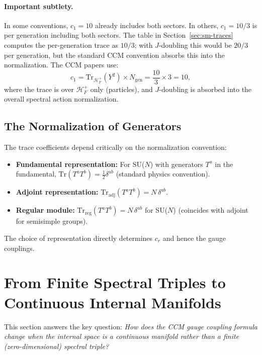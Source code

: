 \documentclass[12pt,a4paper]{article}
\begin{document}
\paragraph{Important subtlety.}
In some conventions, $c_1 = 10$ already includes both sectors.  In others,
$c_1 = 10/3$ is per generation including both sectors.  The
table in Section~\ref{sec:sm-traces} computes the per-generation trace as
$10/3$; with $J$-doubling this would be $20/3$ per generation, but the
standard CCM convention absorbs this into the normalization.  The CCM papers
use:
\begin{equation}
c_1 = \mathrm{Tr}_{\mathcal{H}_F^+}(Y^2) \times N_{\mathrm{gen}} = \frac{10}{3} \times 3 = 10,
\end{equation}
where the trace is over $\mathcal{H}_F^+$ only (particles), and $J$-doubling
is absorbed into the overall spectral action normalization.

\subsection{The Normalization of Generators}

The trace coefficients depend critically on the normalization convention:
\begin{itemize}
\item \textbf{Fundamental representation:} For SU($N$) with generators $T^a$
  in the fundamental, $\mathrm{Tr}(T^a T^b) = \tfrac{1}{2}\delta^{ab}$
  (standard physics convention).
\item \textbf{Adjoint representation:} $\mathrm{Tr}_{\mathrm{adj}}(T^a T^b)
  = N\,\delta^{ab}$.
\item \textbf{Regular module:} $\mathrm{Tr}_{\mathrm{reg}}(T^a T^b)
  = N\,\delta^{ab}$ for SU($N$) (coincides with adjoint for semisimple groups).
\end{itemize}

The choice of representation directly determines $c_r$ and hence the
gauge couplings.

\section{From Finite Spectral Triples to Continuous Internal Manifolds}
\label{sec:finite-to-continuous}

This section answers the key question: \textit{How does the CCM gauge
coupling formula change when the internal space is a continuous manifold
rather than a finite (zero-dimensional) spectral triple?}
\end{document}
